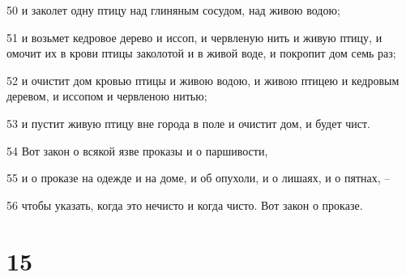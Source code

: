 \par 50 и заколет одну птицу над глиняным сосудом, над живою водою;
\par 51 и возьмет кедровое дерево и иссоп, и червленую нить и живую птицу, и омочит их в крови птицы заколотой и в живой воде, и покропит дом семь раз;
\par 52 и очистит дом кровью птицы и живою водою, и живою птицею и кедровым деревом, и иссопом и червленою нитью;
\par 53 и пустит живую птицу вне города в поле и очистит дом, и будет чист.
\par 54 Вот закон о всякой язве проказы и о паршивости,
\par 55 и о проказе на одежде и на доме, и об опухоли, и о лишаях, и о пятнах, --
\par 56 чтобы указать, когда это нечисто и когда чисто. Вот закон о проказе.

\chapter{15}

